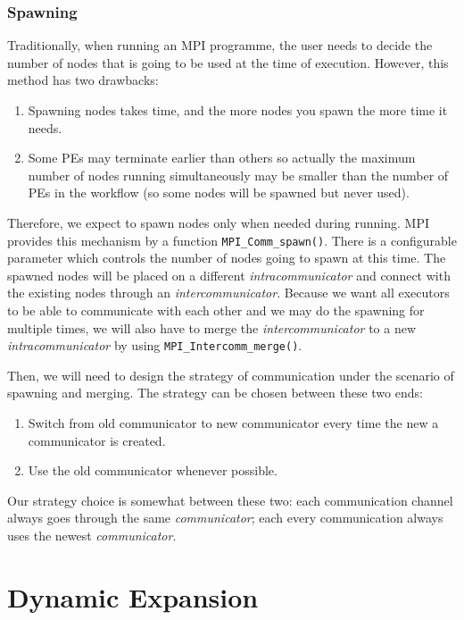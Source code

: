 \documentclass[•]{article}
\begin{document}
	\subsubsection{Spawning}
	Traditionally, when running an MPI programme, the user needs to decide the number of nodes that is going to be used at the time of execution. However, this method has two drawbacks:
	\begin{enumerate}
		\item Spawning nodes takes time, and the more nodes you spawn the more time it needs.
		\item Some PEs may terminate earlier than others so actually the maximum number of nodes running simultaneously may be smaller than the number of PEs in the workflow (so some nodes will be spawned but never used).
	\end{enumerate}
	
	Therefore, we expect to spawn nodes only when needed during running. MPI provides this mechanism by a function \lstinline|MPI_Comm_spawn()|. There is a configurable parameter which controls the number of nodes going to spawn at this time. The spawned nodes will be placed on a different \textit{intracommunicator} and connect with the existing nodes through an \textit{intercommunicator}. Because we want all executors to be able to communicate with each other and we may do the spawning for multiple times, we will also have to merge the \textit{intercommunicator} to a new \textit{intracommunicator} by using \lstinline|MPI_Intercomm_merge()|.
	
	Then, we will need to design the strategy of communication under the scenario of spawning and merging. The strategy can be chosen between these two ends:
	\begin{enumerate}
		\item Switch from old communicator to new communicator every time the new a communicator is created. 
		\item Use the old communicator whenever possible.  
	\end{enumerate}
	
	Our strategy choice is somewhat between these two: each communication channel always goes through the same \textit{communicator}; each every communication always uses the newest \textit{communicator}. 
	
	\section{Dynamic Expansion}
	
\end{document}
